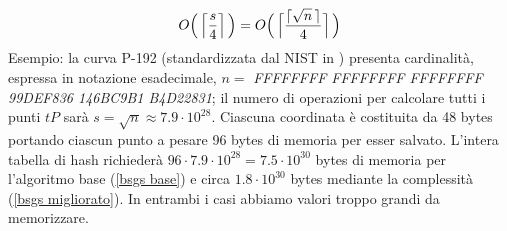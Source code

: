 \documentclass[a4paper,12pt]{tesiinfo}
\DeclarePairedDelimiter\ceil{\lceil}{\rceil}
\newcommand\ddfrac[2]{\frac{\displaystyle #1}{\displaystyle #2}}
\begin{document}
\begin{gather}
 O \Big (\, \Big \lceil \ddfrac{s}{4} \Big \rceil \, \Big ) = O \Big (\, \Big \lceil \ddfrac{\ceil{\sqrt{n}\,}}{4} \Big \rceil \, \Big ) 
 \label{bsgs migliorato}
\end{gather}
Esempio: la curva P-192 (standardizzata dal NIST in \cite{ec standard}) presenta cardinalit\`a, espressa in notazione esadecimale, $n = $ \textit{FFFFFFFF FFFFFFFF FFFFFFFF 99DEF836 146BC9B1 B4D22831}; il numero di operazioni per calcolare tutti i punti $tP$ sar\`a $s = \sqrt{n} \approx 7.9 \cdot 10^{28}$. Ciascuna coordinata \`e costituita da 48 bytes portando ciascun punto a pesare 96 bytes di memoria per esser salvato. L'intera tabella di hash richieder\`a $96 \cdot 7.9\cdot 10^{28} = 7.5 \cdot 10^{30}$ bytes di memoria per l'algoritmo base (\ref{bsgs base}) e circa $1.8 \cdot 10^{30}$ bytes mediante la complessit\`a (\ref{bsgs migliorato}). In entrambi i casi abbiamo valori troppo grandi da memorizzare.
%
%
%
%
%
%
%
%
%
%
%
%
\end{document}
